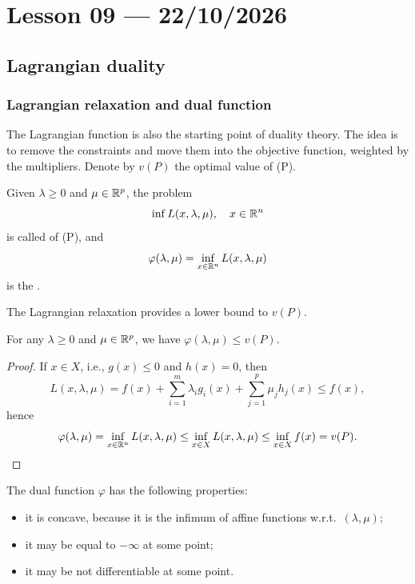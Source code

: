 \section{Lesson 09 --- 22/10/2026}

\subsection{Lagrangian duality}

\subsubsection{Lagrangian relaxation and dual function}

The Lagrangian function is also the starting point of duality theory. The idea is to remove the constraints and move them into the objective function, weighted by the multipliers. Denote by $v(P)$ the optimal value of (P).

\begin{definition}
    Given $\lambda \ge 0$ and $\mu \in \mathbb{R}^p$, the problem
    \[
        \inf L(x, \lambda, \mu), \quad x \in \mathbb{R}^n
    \]
    is called  of (P), and
    \[
        \varphi(\lambda, \mu) = \inf_{x \in \mathbb{R}^n} L(x, \lambda, \mu)
    \]
    is the .
\end{definition}

The Lagrangian relaxation provides a lower bound to $v(P)$.

\begin{theorem}
    \label{thm:lower-bound}
    For any $\lambda \ge 0$ and $\mu \in \mathbb{R}^p$, we have $\varphi(\lambda, \mu) \le v(P)$.
\end{theorem}

\begin{proof}
    If $x \in X$, i.e., $g(x) \le 0$ and $h(x) = 0$, then
    \[
        L(x, \lambda, \mu) = f(x) + \sum_{i=1}^{m} \lambda_i g_i(x) + \sum_{j=1}^{p} \mu_j h_j(x) \le f(x),
    \]
    hence
    \[
        \varphi(\lambda, \mu) = \inf_{x \in \mathbb{R}^n} L(x, \lambda, \mu) \le \inf_{x \in X} L(x, \lambda, \mu) \le \inf_{x \in X} f(x) = v(P). \qedhere
    \]
\end{proof}

The dual function $\varphi$ has the following properties:
\begin{itemize}
    \item it is concave, because it is the infimum of affine functions w.r.t.\ $(\lambda, \mu)$;
    \item it may be equal to $-\infty$ at some point;
    \item it may be not differentiable at some point.
\end{itemize}

